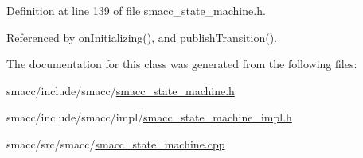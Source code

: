 Definition at line 139 of file smacc\+\_\+state\+\_\+machine.\+h.



Referenced by on\+Initializing(), and publish\+Transition().



The documentation for this class was generated from the following files\+:\begin{DoxyCompactItemize}
\item 
smacc/include/smacc/\hyperlink{smacc__state__machine_8h}{smacc\+\_\+state\+\_\+machine.\+h}\item 
smacc/include/smacc/impl/\hyperlink{smacc__state__machine__impl_8h}{smacc\+\_\+state\+\_\+machine\+\_\+impl.\+h}\item 
smacc/src/smacc/\hyperlink{smacc__state__machine_8cpp}{smacc\+\_\+state\+\_\+machine.\+cpp}\end{DoxyCompactItemize}
